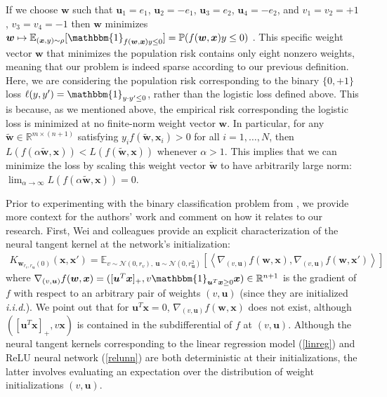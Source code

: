 \documentclass{article}
\begin{document}
If we choose $\boldsymbol{w}$ such that $\boldsymbol{u}_1 = e_1$, $\boldsymbol{u}_2 = -e_1$, $\boldsymbol{u}_3 = e_2$, $\boldsymbol{u}_4 = -e_2$, and $v_1 = v_2 = +1$, $v_3 = v_4 = -1$ then $\boldsymbol{w}$ minimizes $\boldsymbol{w} \mapsto \mathbb{E}_{(\boldsymbol{x}, y) \sim \rho} [\mathbbm{1}_{f(\boldsymbol{w}, \boldsymbol{x})y \leq 0}] = \mathbb{P}(f(\boldsymbol{w}, \boldsymbol{x})y \leq 0)$ \cite{wei2019regularization}. This specific weight vector $\boldsymbol{w}$ that minimizes the population risk contains only eight nonzero weights, meaning that our problem is indeed sparse according to our previous definition. Here, we are considering the population risk corresponding to the binary $\{0, +1\}$ loss $\ell(y, y') = \mathbbm{1}_{y \cdot y' \leq 0}$, rather than the logistic loss defined above. This is because, as we mentioned above, the empirical risk corresponding the logistic loss is minimized at no finite-norm weight vector $\boldsymbol{w}$. In particular, for any $\boldsymbol{\tilde{w}} \in \mathbb{R}^{m \times (n+1)}$ satisfying $y_i f(\boldsymbol{\tilde{w}}, \boldsymbol{x}_i) > 0$ for all $i = 1, \ldots, N$, then $L(f(\alpha \boldsymbol{\tilde{w}}, \boldsymbol{x})) < L(f(\boldsymbol{\tilde{w}}, \boldsymbol{x}))$ whenever $\alpha > 1$. This implies that we can minimize the loss by scaling this weight vector $\boldsymbol{\tilde{w}}$ to have arbitrarily large norm: $\lim_{\alpha \to \infty} L(f(\alpha \boldsymbol{\tilde{w}}, \boldsymbol{x})) = 0$.

Prior to experimenting with the binary classification problem from \cite{wei2019regularization}, we provide more context for the authors' work and comment on how it relates to our research. First, Wei and colleagues provide an explicit characterization of the neural tangent kernel at the network's initialization:
\begin{align*}
    K_{\boldsymbol{w}_{r_v, r_{\boldsymbol{u}}}(0)}(\boldsymbol{x}, \boldsymbol{x}') = \mathbb{E}_{v \sim \mathcal{N}(0, r_v), \ \boldsymbol{u} \sim \mathcal{N}(0, r_{\boldsymbol{u}}^2)}[ \left\langle \nabla_{(v, \boldsymbol{u})}f(\boldsymbol{w}, \boldsymbol{x}), \nabla_{(v, \boldsymbol{u})}f(\boldsymbol{w}, \boldsymbol{x}') \right\rangle]
\end{align*}
where $\nabla_{(v, \boldsymbol{u})}f(\boldsymbol{w}, \boldsymbol{x}) = ([\boldsymbol{u}^T\boldsymbol{x}]_+, v\mathbbm{1}_{\boldsymbol{u}^T\boldsymbol{x} \geq 0}\boldsymbol{x}) \in \mathbb{R}^{n + 1}$ is the gradient of $f$ with respect to an arbitrary pair of weights $(v, \boldsymbol{u})$ (since they are initialized \textit{i.i.d.}). We point out that for $\boldsymbol{u}^T\boldsymbol{x}=0$, $\nabla_{(v, \boldsymbol{u})}f(\boldsymbol{w}, \boldsymbol{x})$ does not exist, although $([\boldsymbol{u}^T\boldsymbol{x}]_+, v\boldsymbol{x})$ is contained in the subdifferential of $f$ at $(v, \boldsymbol{u})$. Although the neural tangent kernels corresponding to the linear regression model (\ref{linreg}) and ReLU neural network (\ref{relunn}) are both deterministic at their initializations, the latter involves evaluating an expectation over the distribution of weight initializations $(v, \boldsymbol{u})$.
\end{document}

